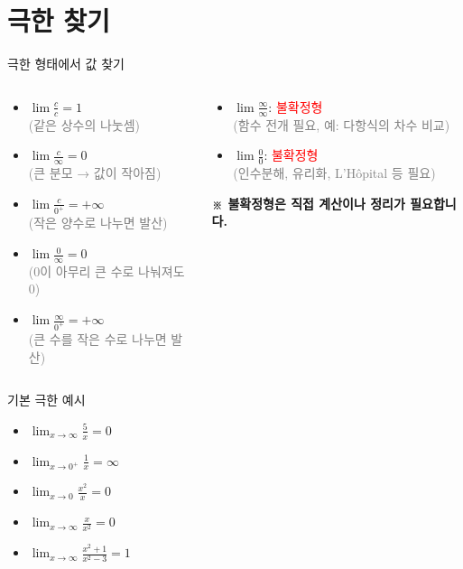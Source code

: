 \documentclass[aspectratio=169]{beamer}
\begin{document}
\section{극한 찾기}
\begin{frame}{극한 형태에서 값 찾기}
  \begin{columns}
    \begin{column}{0.5\textwidth}
      \begin{itemize}
        \item \( \lim \frac{c}{c} = 1 \) \\
              \textcolor{gray}{(같은 상수의 나눗셈)}
        \item \( \lim \frac{c}{\infty} = 0 \) \\
              \textcolor{gray}{(큰 분모 → 값이 작아짐)}
        \item \( \lim \frac{c}{0^+} = +\infty \) \\
              \textcolor{gray}{(작은 양수로 나누면 발산)}
        \item \( \lim \frac{0}{\infty} = 0 \) \\
              \textcolor{gray}{(0이 아무리 큰 수로 나눠져도 0)}
        \item \( \lim \frac{\infty}{0^+} = +\infty \) \\
              \textcolor{gray}{(큰 수를 작은 수로 나누면 발산)}
      \end{itemize}
    \end{column}
    \begin{column}{0.5\textwidth}
      \begin{itemize}
        \item \( \lim \frac{\infty}{\infty} \): \textcolor{red}{불확정형} \\
              \textcolor{gray}{(함수 전개 필요, 예: 다항식의 차수 비교)}
        \item \( \lim \frac{0}{0} \): \textcolor{red}{불확정형} \\
              \textcolor{gray}{(인수분해, 유리화, L'Hôpital 등 필요)}
      \end{itemize}
      \vspace{1em}
      \textbf{※ 불확정형은 직접 계산이나 정리가 필요합니다.}
    \end{column}
  \end{columns}
\end{frame}



\begin{frame}{기본 극한 예시}
  \begin{itemize}
    \item \( \lim_{x \to \infty} \frac{5}{x} = 0 \)
    \item \( \lim_{x \to 0^+} \frac{1}{x} = \infty \)
    \item \( \lim_{x \to 0} \frac{x^2}{x} = 0 \)
    \item \( \lim_{x \to \infty} \frac{x}{x^2} = 0 \)
    \item \( \lim_{x \to \infty} \frac{x^2 + 1}{x^2 - 3} = 1 \)
  \end{itemize}
\end{frame}
\end{document}
